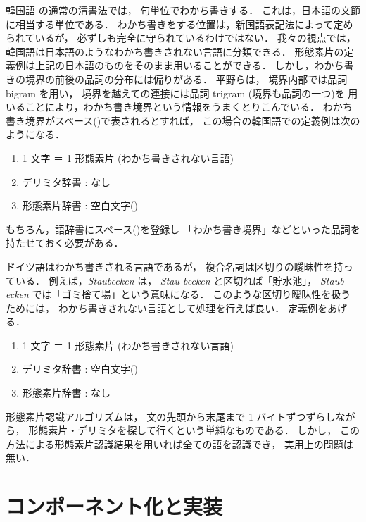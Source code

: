 韓国語
の通常の清書法では，
句単位でわかち書きする．
これは，日本語の文節に相当する単位である．
わかち書きをする位置は，新国語表記法\cite{全96}によって定められているが，
必ずしも完全に守られているわけではない\cite{平野97}．
我々の視点では，韓国語は日本語のようなわかち書きされない言語に分類できる．
形態素片の定義例は上記の日本語のものをそのまま用いることができる．
しかし，わかち書きの境界の前後の品詞の分布には偏りがある．
平野ら\cite{Hirano96}\cite{平野97}は，
境界内部では品詞 bigram を用い，
境界を越えての連接には品詞 trigram (境界も品詞の一つ)を
用いることにより，わかち書き境界という情報をうまくとりこんでいる．
わかち書き境界がスペース(\delimi)で表されるとすれば，
この場合の韓国語での定義例は次のようになる．
\begin{enumerate}
\item 1 文字 ＝ 1 形態素片 (わかち書きされない言語)
\item デリミタ辞書 : なし
\item 形態素片辞書 : 空白文字(\delimi)
\end{enumerate}
もちろん，語辞書にスペース(\delimi)を登録し
「わかち書き境界」などといった品詞を持たせておく必要がある．

ドイツ語はわかち書きされる言語であるが，
複合名詞は区切りの曖昧性を持っている．
例えば，{\it Staubecken} は，
{\it Stau-becken} と区切れば「貯水池」，
{\it Staub-ecken} では「ゴミ捨て場」という意味になる\cite{Lezius98}．
このような区切り曖昧性を扱うためには，
わかち書きされない言語として処理を行えば良い．
定義例をあげる．
\begin{enumerate}
\item 1 文字 ＝ 1 形態素片 (わかち書きされない言語)
\item デリミタ辞書 : 空白文字(\delimi)
\item 形態素片辞書 : なし
\end{enumerate}

形態素片認識アルゴリズムは，
文の先頭から末尾まで 1 バイトずつずらしながら，
形態素片・デリミタを探して行くという単純なものである．
しかし，
この方法による形態素片認識結果を用いれば全ての語を認識でき，
実用上の問題は無い．













\section{コンポーネント化と実装}\label{comp}

